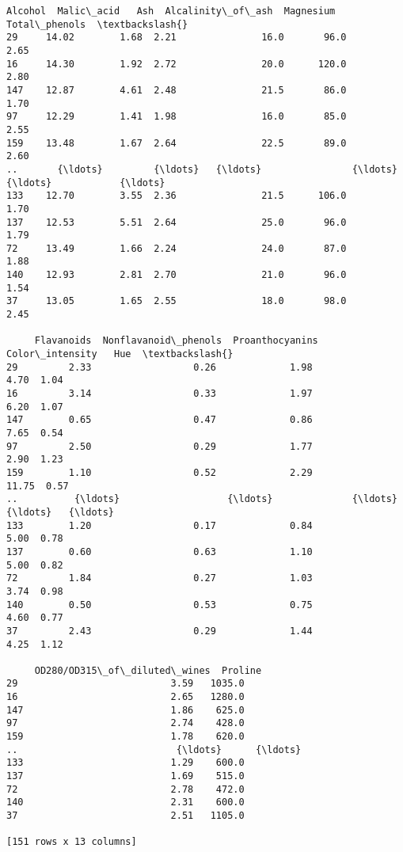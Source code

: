 \documentclass[11pt]{article}
\makeatletter
\newcommand{\boxspacing}{\kern\kvtcb@left@rule\kern\kvtcb@boxsep}
\newcommand{\prompt}[4]{
        {\ttfamily\llap{{\color{#2}[#3]:\hspace{3pt}#4}}\vspace{-\baselineskip}}
    }
\makeatother
\begin{document}
            \begin{tcolorbox}[breakable, size=fbox, boxrule=.5pt, pad at break*=1mm, opacityfill=0]
\prompt{Out}{outcolor}{50}{\boxspacing}
\begin{Verbatim}[commandchars=\\\{\}]
     Alcohol  Malic\_acid   Ash  Alcalinity\_of\_ash  Magnesium  Total\_phenols  \textbackslash{}
29     14.02        1.68  2.21               16.0       96.0           2.65
16     14.30        1.92  2.72               20.0      120.0           2.80
147    12.87        4.61  2.48               21.5       86.0           1.70
97     12.29        1.41  1.98               16.0       85.0           2.55
159    13.48        1.67  2.64               22.5       89.0           2.60
..       {\ldots}         {\ldots}   {\ldots}                {\ldots}        {\ldots}            {\ldots}
133    12.70        3.55  2.36               21.5      106.0           1.70
137    12.53        5.51  2.64               25.0       96.0           1.79
72     13.49        1.66  2.24               24.0       87.0           1.88
140    12.93        2.81  2.70               21.0       96.0           1.54
37     13.05        1.65  2.55               18.0       98.0           2.45

     Flavanoids  Nonflavanoid\_phenols  Proanthocyanins  Color\_intensity   Hue  \textbackslash{}
29         2.33                  0.26             1.98             4.70  1.04
16         3.14                  0.33             1.97             6.20  1.07
147        0.65                  0.47             0.86             7.65  0.54
97         2.50                  0.29             1.77             2.90  1.23
159        1.10                  0.52             2.29            11.75  0.57
..          {\ldots}                   {\ldots}              {\ldots}              {\ldots}   {\ldots}
133        1.20                  0.17             0.84             5.00  0.78
137        0.60                  0.63             1.10             5.00  0.82
72         1.84                  0.27             1.03             3.74  0.98
140        0.50                  0.53             0.75             4.60  0.77
37         2.43                  0.29             1.44             4.25  1.12

     OD280/OD315\_of\_diluted\_wines  Proline
29                           3.59   1035.0
16                           2.65   1280.0
147                          1.86    625.0
97                           2.74    428.0
159                          1.78    620.0
..                            {\ldots}      {\ldots}
133                          1.29    600.0
137                          1.69    515.0
72                           2.78    472.0
140                          2.31    600.0
37                           2.51   1105.0

[151 rows x 13 columns]
\end{Verbatim}
\end{tcolorbox}
        
\end{document}
